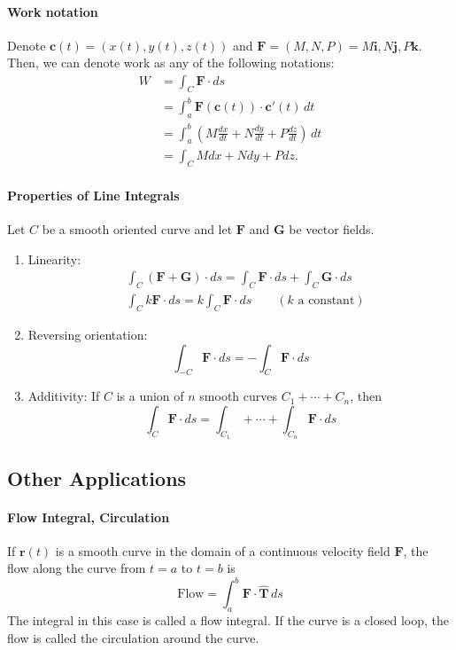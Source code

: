 \paragraph{Work notation}
Denote \(\textbf{c}(t) = (x(t), y(t), z(t))\) and \(\textbf{F}=(M,N,P) = M\textbf{i}, N\textbf{j}, P\textbf{k}\). Then, we can denote work as any of the following notations:
\begin{align*}
    W & = \int_C \textbf{F} \cdot ds \\
    & = \int_a^b \textbf{F}(\textbf{c}(t)) \cdot \textbf{c}'(t) \, dt \tag{Definition} \\
    & = \int_a^b \left( M\frac{dx}{dt} + N\frac{dy}{dt} + P\frac{dz}{dt} \right) \, dt\\
    & = \int_C Mdx + Ndy + Pdz. \tag{Alternative form}
\end{align*}

\paragraph{Properties of Line Integrals}
Let \(C\) be a smooth oriented curve and let \(\textbf{F}\) and \(\textbf{G}\) be vector fields.
\begin{enumerate}[label = (\roman*)]
    \item Linearity: 
    \begin{align*}
        & \int_C (\textbf{F} + \textbf{G}) \cdot ds = \int_C \textbf{F} \cdot ds + \int_C \textbf{G} \cdot ds \\
        & \int_C k\textbf{F} \cdot ds = k \int_C \textbf{F} \cdot ds \qquad (k \text{ a constant})
    \end{align*}
    \item Reversing orientation:
    \[\int_{-C} \textbf{F} \cdot ds = - \int_C \textbf{F} \cdot ds\]
    \item Additivity: If \(C\) is a union of \(n\) smooth curves \(C_1 + \cdots + C_n\), then
    \[\int_C \textbf{F} \cdot ds = \int_{C_1} + \cdots + \int_{C_n} \textbf{F} \cdot ds\]
\end{enumerate}

\subsection{Other Applications}
\paragraph{Flow Integral, Circulation}
If \(\textbf{r}(t)\) is a smooth curve in the domain of a continuous velocity field \(\textbf{F}\), the flow along the curve from \(t = a\) to \(t = b\) is
\[\text{Flow} = \int_a^b \textbf{F} \cdot \hat{\textbf{T}} \, ds\]
The integral in this case is called a flow integral. If the curve is a closed loop, the flow is called the circulation around the curve. 

